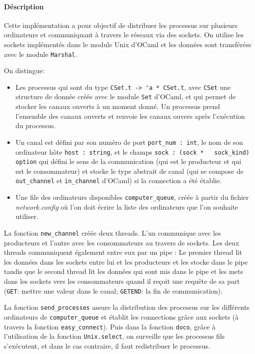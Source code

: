 \documentclass[]{scrartcl}
\let\oldparagraph\paragraph
\renewcommand{\paragraph}[1]{\oldparagraph{#1}\mbox{}}
\begin{document}
\paragraph{Déscription}\label{duxe9scription}

Cette implémentation a pour objectif de distribuer les processus sur
plusieurs ordinateurs et communiquant à travers le réseaux via des
sockets. On utilise les sockets implémentés dans le module Unix d'OCaml
et les données sont transféréss avec le module \lstinline!Marshal!.

On distingue:

\begin{itemize}
\itemsep1pt\parskip0pt
\item
  Les processus qui sont du type \lstinline!CSet.t -> 'a * CSet.t!, avec
  \lstinline!CSet! une structure de donnée créée avec le module
  \lstinline!Set! d'OCaml, et qui permet de stocker les canaux ouverts à
  un moment donné. Un processus prend l'ensemble des canaux ouverts et
  renvoie les canaux ouvers après l'exécution du processus.
\item
  Un canal est défini par son numéro de port \lstinline!port_num : int!,
  le nom de son ordinateur hôte \lstinline!host : string!, et le champs
  \lstinline!sock : (sock *   sock_kind) option! qui défini le sens de
  la communication (qui est le producteur et qui est le consommateur) et
  stocke le type abstrait de canal (qui se compose de
  \lstinline!out_channel! et \lstinline!in_channel! d'OCaml) si la
  connection a été établie.
\item
  Une file des ordinateurs disponibles \lstinline!computer_queue!, créée
  à partir du fichier \emph{network.config} où l'on doit écrire la liste
  des ordinateurs que l'on souhaite utiliser.
\end{itemize}

La fonction \lstinline!new_channel! créée deux threads. L'un communique
avec les producteurs et l'autre avec les consommateurs au travers de
sockets. Les deux threads communiquent également entre eux par un pipe :
Le premier thread lit les données dans les sockets entre lui et les
producteurs et les stocke dans le pipe tandis que le second thread lit
les données qui sont mis dans le pipe et les mets dans les sockets vers
les consommateurs quand il reçoit une requête de sa part
(\lstinline!GET!: mettre une valeur dans le canal; \lstinline!GETEND!:
la fin de communication).

La fonction \lstinline!send_processes! assure la distribution des
processus sur les différents ordinateurs de \lstinline!computer_queue!
et établit les connections grâce aux sockets (à travers la fonction
\lstinline!easy_connect!). Puis dans la fonction \lstinline!doco!, grâce
à l'utilisation de la fonction \lstinline!Unix.select!, on surveille que
les processus fils s'exécutent, et dans le cas contraire, il faut
redistribuer le processus.
\end{document}
